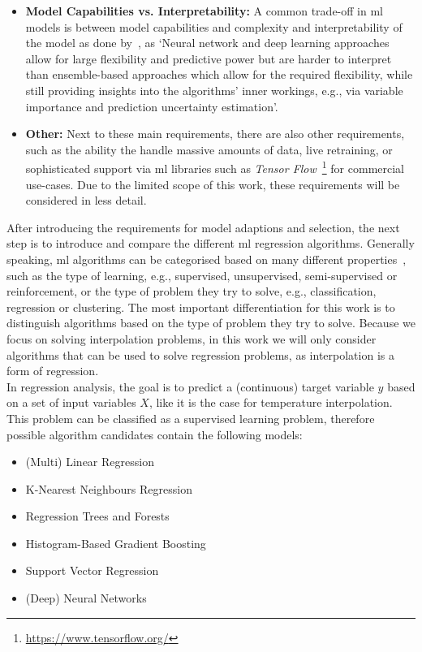 \begin{itemize}
    \item \textbf{Model Capabilities vs. Interpretability:} A common trade-off in \gls{ml} models is between model capabilities and complexity and interpretability of the model as done by~\cite{zumwald2021mapping}, as `Neural network and deep learning approaches allow for large flexibility and predictive power but are harder to interpret than ensemble-based approaches which allow for the required flexibility, while still providing insights into the algorithms' inner workings, e.g., via variable importance and prediction uncertainty estimation'.
    \item \textbf{Other:} Next to these main requirements, there are also other requirements, such as the ability the handle massive amounts of data, live retraining, or sophisticated support via \gls{ml} libraries such as \textit{Tensor Flow}~\footnote{\url{https://www.tensorflow.org/}} for commercial use-cases. Due to the limited scope of this work, these requirements will be considered in less detail.
\end{itemize}

After introducing the requirements for model adaptions and selection, the next step is to introduce and compare the different \gls{ml} regression algorithms.
Generally speaking, \gls{ml} algorithms can be categorised based on many different properties~\cite{sarker2021machine}, such as the type of learning, e.g., supervised, unsupervised, semi-supervised or reinforcement, or the type of problem they try to solve, e.g., classification, regression or clustering. The most important differentiation for this work is to distinguish algorithms based on the type of problem they try to solve. Because we focus on solving interpolation problems, in this work we will only consider algorithms that can be used to solve regression problems, as interpolation is a form of regression.\\
In regression analysis, the goal is to predict a (continuous) target variable $y$ based on a set of input variables $X$, like it is the case for temperature interpolation. This problem can be classified as a supervised learning problem, therefore possible algorithm candidates contain the following models:

\begin{itemize}
    \item (Multi) Linear Regression
    \item K-Nearest Neighbours Regression
    \item Regression Trees and Forests
    \item Histogram-Based Gradient Boosting
    \item Support Vector Regression
    \item (Deep) Neural Networks
\end{itemize}

